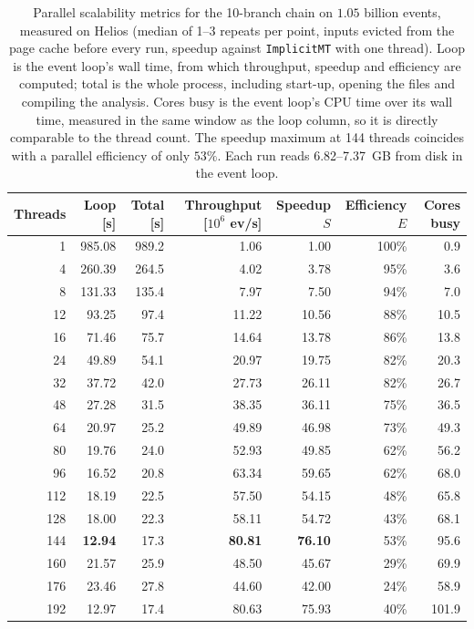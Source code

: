 \begin{table}[htbp]
\centering
\caption{Parallel scalability metrics for the 10-branch chain on $1.05$ billion events, measured on Helios (median of 1--3 repeats per point, inputs evicted from the page cache before every run, speedup against \texttt{ImplicitMT} with one thread). Loop is the event loop's wall time, from which throughput, speedup and efficiency are computed; total is the whole process, including start-up, opening the files and compiling the analysis. Cores busy is the event loop's CPU time over its wall time, measured in the same window as the loop column, so it is directly comparable to the thread count. The speedup maximum at 144 threads coincides with a parallel efficiency of only $53\%$. Each run reads 6.82--7.37~GB from disk in the event loop.}
\label{tab:scalability-chain11}
\setlength{\tabcolsep}{5pt}
\begin{tabular}{rrrrrrr}
\toprule
Threads & Loop [s] & Total [s] & Throughput [$10^6$ ev/s] & Speedup $S$ & Efficiency $E$ & Cores busy \\
\midrule
 1 & 985.08 & 989.2 & 1.06 & 1.00 & 100\% & 0.9 \\
 4 & 260.39 & 264.5 & 4.02 & 3.78 & 95\% & 3.6 \\
 8 & 131.33 & 135.4 & 7.97 & 7.50 & 94\% & 7.0 \\
12 & 93.25 & 97.4 & 11.22 & 10.56 & 88\% & 10.5 \\
16 & 71.46 & 75.7 & 14.64 & 13.78 & 86\% & 13.8 \\
24 & 49.89 & 54.1 & 20.97 & 19.75 & 82\% & 20.3 \\
32 & 37.72 & 42.0 & 27.73 & 26.11 & 82\% & 26.7 \\
48 & 27.28 & 31.5 & 38.35 & 36.11 & 75\% & 36.5 \\
64 & 20.97 & 25.2 & 49.89 & 46.98 & 73\% & 49.3 \\
80 & 19.76 & 24.0 & 52.93 & 49.85 & 62\% & 56.2 \\
96 & 16.52 & 20.8 & 63.34 & 59.65 & 62\% & 68.0 \\
112 & 18.19 & 22.5 & 57.50 & 54.15 & 48\% & 65.8 \\
128 & 18.00 & 22.3 & 58.11 & 54.72 & 43\% & 68.1 \\
144 & \textbf{12.94} & 17.3 & \textbf{80.81} & \textbf{76.10} & 53\% & 95.6 \\
160 & 21.57 & 25.9 & 48.50 & 45.67 & 29\% & 69.9 \\
176 & 23.46 & 27.8 & 44.60 & 42.00 & 24\% & 58.9 \\
192 & 12.97 & 17.4 & 80.63 & 75.93 & 40\% & 101.9 \\
\bottomrule
\end{tabular}
\end{table}
